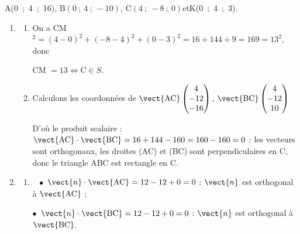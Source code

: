 
\medskip

\begin{center}A(0~;~4~;~16), \quad B$(0~;~4~;~- 10)$, \quad C$(4~;~-8~;~0)$\quad et\quad  K(0~;~4~;~3).\end{center}


\medskip

\begin{enumerate}
\item 
	\begin{enumerate}
		\item %
		On a CM$^2 = (4 - 0)^2 + (- 8 - 4)^2 + (0 - 3)^2 = 16 + 144 + 9 = 169 = 13^2$, donc 
		
CM $ = 13 \iff \text{C} \in S$.
		\item %
Calculons les coordonnées de $\vect{\text{AC}}\begin{pmatrix}4\\-12\\-16\end{pmatrix}, \: \vect{\text{BC}}\begin{pmatrix}4\\-12\\10\end{pmatrix}$

D'où le produit scalaire : $\vect{\text{AC}} \cdot \vect{\text{BC}} = 16 + 144 - 160 = 160 - 160 = 0$ : les vecteurs sont orthogonaux, les droites (AC) et (BC) sont perpendiculaires en C, donc le triangle ABC est rectangle en C.
	\end{enumerate}
\item 
	\begin{enumerate}
		\item ~%
$\bullet~~$$\vect{n} \cdot \vect{\text{AC}} = 12 - 12 + 0 = 0$ : $\vect{n}$ est orthogonal à $\vect{\text{AC}}$ ;

$\bullet~~$$\vect{n} \cdot \vect{\text{BC}} = 12 - 12 + 0 = 0$ : $\vect{n}$ est orthogonal à $\vect{\text{BC}}$.


\end{enumerate}
\end{enumerate}

